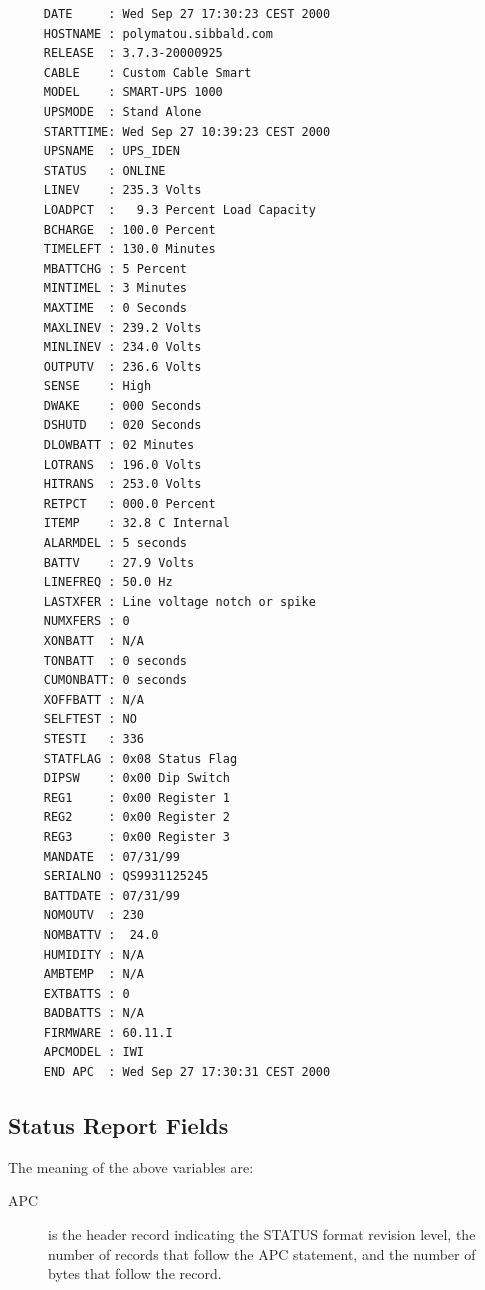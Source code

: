{{{{{{{{\footnotesize
\begin{verbatim}
     DATE     : Wed Sep 27 17:30:23 CEST 2000
     HOSTNAME : polymatou.sibbald.com
     RELEASE  : 3.7.3-20000925
     CABLE    : Custom Cable Smart
     MODEL    : SMART-UPS 1000
     UPSMODE  : Stand Alone
     STARTTIME: Wed Sep 27 10:39:23 CEST 2000
     UPSNAME  : UPS_IDEN
     STATUS   : ONLINE
     LINEV    : 235.3 Volts
     LOADPCT  :   9.3 Percent Load Capacity
     BCHARGE  : 100.0 Percent
     TIMELEFT : 130.0 Minutes
     MBATTCHG : 5 Percent
     MINTIMEL : 3 Minutes
     MAXTIME  : 0 Seconds
     MAXLINEV : 239.2 Volts
     MINLINEV : 234.0 Volts
     OUTPUTV  : 236.6 Volts
     SENSE    : High
     DWAKE    : 000 Seconds
     DSHUTD   : 020 Seconds
     DLOWBATT : 02 Minutes
     LOTRANS  : 196.0 Volts
     HITRANS  : 253.0 Volts
     RETPCT   : 000.0 Percent
     ITEMP    : 32.8 C Internal
     ALARMDEL : 5 seconds
     BATTV    : 27.9 Volts
     LINEFREQ : 50.0 Hz
     LASTXFER : Line voltage notch or spike
     NUMXFERS : 0
     XONBATT  : N/A
     TONBATT  : 0 seconds
     CUMONBATT: 0 seconds
     XOFFBATT : N/A
     SELFTEST : NO
     STESTI   : 336
     STATFLAG : 0x08 Status Flag
     DIPSW    : 0x00 Dip Switch
     REG1     : 0x00 Register 1
     REG2     : 0x00 Register 2
     REG3     : 0x00 Register 3
     MANDATE  : 07/31/99
     SERIALNO : QS9931125245
     BATTDATE : 07/31/99
     NOMOUTV  : 230
     NOMBATTV :  24.0
     HUMIDITY : N/A
     AMBTEMP  : N/A
     EXTBATTS : 0
     BADBATTS : N/A
     FIRMWARE : 60.11.I
     APCMODEL : IWI
     END APC  : Wed Sep 27 17:30:31 CEST 2000
\end{verbatim}
\normalsize

\label{Status-Report-Fields}

\subsection*{Status Report Fields}

\label{index-Status-256}
The meaning of the above variables are:  

\begin{description}

\item [APC]
   is the header record indicating the STATUS format revision level, the number
of records that follow the APC statement, and the number of bytes that follow
the record.  


\end{description}}}}}}}}}
